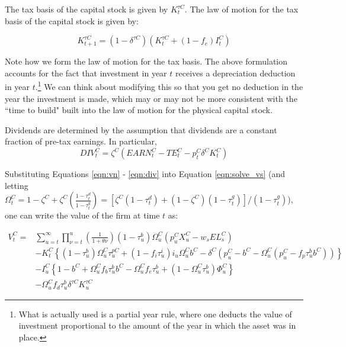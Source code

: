 The tax basis of the capital stock is given by $K^{\tau C}_{t}$.  The law of motion for the tax basis of the capital stock is given by:

\begin{equation}
\label{eqn:lom_taxcapital}
K^{\tau C}_{t+1}=(1-\delta^{\tau C})(K^{\tau C}_{t} + (1-f_{e})I^{C}_{t})
\end{equation}

\noindent\noindent Note how we form the law of motion for the tax basis.  The above formulation accounts for the fact that investment in year $t$ receives a depreciation deduction in year $t$.\footnote{What is actually used is a partial year rule, where one deducts the value of investment proportional to the amount of the year in which the asset was in place.}  We can think about modifying this so that you get no deduction in the year the investment is made, which may or may not be more consistent with the ``time to build" built into the law of motion for the physical capital stock.

Dividends are determined by the assumption that dividends are a constant fraction of pre-tax earnings.  In particular, 
\begin{equation}
\label{eqn:div}
DIV^{C}_{t}=\zeta^{C}(EARN^{C}_{t}-TE^{C}_{t}-p^{C}_{t}\delta^{C}K^{C}_{t})
\end{equation}

Substituting Equations \ref{eqn:vn} - \ref{eqn:div} into Equation \ref{eqn:solve_vs}  (and letting $\Omega^{C}_{t}=1 - \zeta^{C} + \zeta^{C}\left(\frac{1-\tau^{d}_{t}}{1-\tau^{g}_{t}}\right) = \left[\zeta^{C}(1-\tau^{d}_{t}) + (1-\zeta^{C})(1-\tau^{g}_{t})\right]/(1-\tau^{g}_{t})$), one can write the value of the firm at time $t$ as:

\begin{equation}
\label{eqn:vs}
\begin{split}
V^{C}_{t} = &  \sum_{u=t}^{\infty} \prod_{\nu=t}^{u}\left(\frac{1}{1+\theta{\nu}}\right) (1-\tau^{b}_{u})\Omega^{C}_{u}(p^{C}_{u}X^{C}_{u}-w_{s}EL^{C}_{s})  \\ 
 & - K^{C}_{t} \left\{(1-\tau^{b}_{u})\Omega^{C}_{u}\tau^{pC}_{u}+(1-f_{i}\tau^{i}_{u})i_{u}\Omega^{C}_{u}b^{C}-\delta^{C}(p^{C}_{u}-b^{C}-\Omega^{C}_{u}(p^{C}_{u}-f_{p}\tau^{b}_{u}b^{C}))\right\}  \\
 & - I^{C}_{u}\left\{1-b^{C}+\Omega^{C}_{u}f_{b}\tau^{b}_{u}b^{C}-\Omega^{C}_{u}f_{e}\tau^{b}_{u} + (1-\Omega^{C}_{u}\tau^{b}_{u})\Phi^{C}_{u}\right\} \\
 & - \Omega^{C}_{u}f_{d}\tau^{b}_{u}\delta^{\tau C}K^{\tau C}_{u}
\end{split}
\end{equation}

